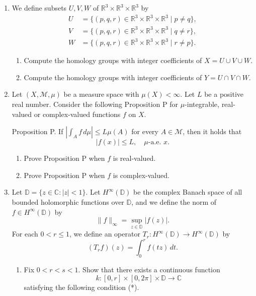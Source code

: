 \documentclass{article}
\begin{document}
\begin{enumerate}[label=\fbox{\arabic*}]
  \item We define subsets $U, V, W$ of $\mathbb{R}^3 \times \mathbb{R}^3 \times \mathbb{R}^3$ by
        \begin{align*}
          U &= \{ (p, q, r) \in \mathbb{R}^3 \times \mathbb{R}^3 \times \mathbb{R}^3 \mid p \neq q \}, \\
          V &= \{ (p, q, r) \in \mathbb{R}^3 \times \mathbb{R}^3 \times \mathbb{R}^3 \mid q \neq r \}, \\
          W &= \{ (p, q, r) \in \mathbb{R}^3 \times \mathbb{R}^3 \times \mathbb{R}^3 \mid r \neq p \}.
        \end{align*}
        \begin{enumerate}[label=(\arabic*)]
          \item Compute the homology groups with integer coefficients of $X = U \cup V \cup W$.
          \item Compute the homology groups with integer coefficients of $Y = U \cap V \cap W$.
        \end{enumerate}

  \item Let $(X, \mathcal{M}, \mu)$ be a measure space with $\mu(X) < \infty$. Let $L$ be a positive real number. Consider the following Proposition P for $\mu$-integrable, real-valued or complex-valued functions $f$ on $X$.

        Proposition P. If $\left| \int_A f \, d\mu \right| \le L \mu(A)$ for every $A \in \mathcal{M}$, then it holds that
        \[
          |f(x)| \le L, \quad \mu\text{-a.e. } x.
        \]
        \begin{enumerate}[label=(\arabic*)]
          \item Prove Proposition P when $f$ is real-valued.
          \item Prove Proposition P when $f$ is complex-valued.
        \end{enumerate}

  \item Let $\mathbb{D} = \{ z \in \mathbb{C} : |z| < 1 \}$. Let $H^\infty(\mathbb{D})$ be the complex Banach space of all bounded holomorphic functions over $\mathbb{D}$, and we define the norm of $f \in H^\infty(\mathbb{D})$ by
        \[
          \|f\|_\infty = \sup_{z \in \mathbb{D}} |f(z)|.
        \]
        For each $0 < r \le 1$, we define an operator $T_r: H^\infty(\mathbb{D}) \to H^\infty(\mathbb{D})$ by
        \[
          (T_r f)(z) = \int_0^r f(tz) \, dt.
        \]
        \begin{enumerate}[label=(\arabic*)]
          \item Fix $0 < r < s < 1$. Show that there exists a continuous function
                \[
                  k: [0, r] \times [0, 2\pi] \times \mathbb{D} \to \mathbb{C}
                \]
                satisfying the following condition (*).


\end{enumerate}
\end{enumerate}
\end{document}
